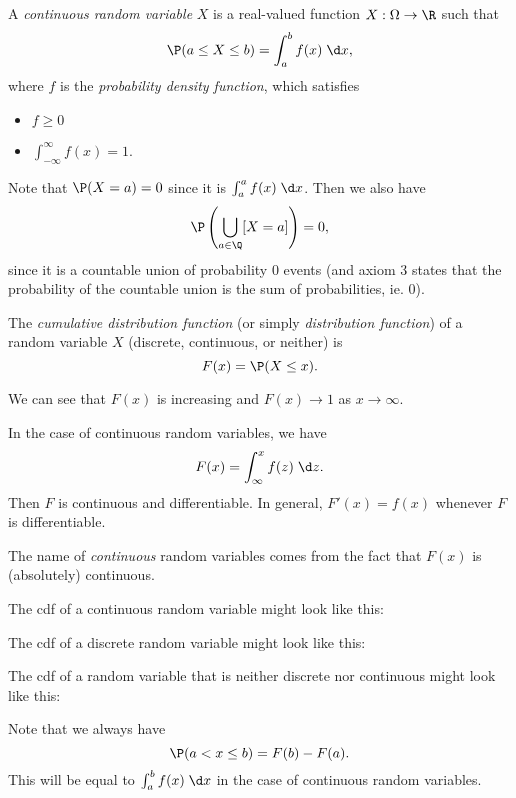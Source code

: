\documentclass[a4paper]{article}
\begin{document}
\begin{defi}
  A \emph{continuous random variable} $X$ is a real-valued function $X: \Omega \to \R$ such that
  \[
    \P(a \leq X \leq b) = \int_a^b f(x) \;\d x,
  \]
  where $f$ is the \emph{probability density function}, which satisfies
  \begin{itemize}
    \item $f \geq 0$
    \item $\int_{-\infty}^\infty f(x) = 1$.
  \end{itemize}
\end{defi}
Note that $\P(X = a) = 0$ since it is $\int_a^a f(x)\;\d x$. Then we also have
\[
  \P\left(\bigcup_{a\in \Q} [X = a]\right) = 0,
\]
since it is a countable union of probability 0 events (and axiom 3 states that the probability of the countable union is the sum of probabilities, ie. 0).

\begin{defi}
  The \emph{cumulative distribution function} (or simply \emph{distribution function}) of a random variable $X$ (discrete, continuous, or neither) is
  \[
    F(x) = \P(X \leq x).
  \]
\end{defi}
We can see that $F(x)$ is increasing and $F(x) \to 1$ as $x\to \infty$.

In the case of continuous random variables, we have
\[
  F(x) = \int_\infty^x f(z) \;\d z.
\]
Then $F$ is continuous and differentiable. In general, $F'(x) = f(x)$ whenever $F$ is differentiable.

The name of \emph{continuous} random variables comes from the fact that $F(x)$ is (absolutely) continuous.

The cdf of a continuous random variable might look like this:
\begin{center}
\end{center}
The cdf of a discrete random variable might look like this:
\begin{center}
\end{center}
The cdf of a random variable that is neither discrete nor continuous might look like this:
\begin{center}
\end{center}
Note that we always have
\[
  \P(a < x \leq b) = F(b) - F(a).
\]
This will be equal to $\int_a^b f(x)\;\d x$ in the case of continuous random variables.
\end{document}

